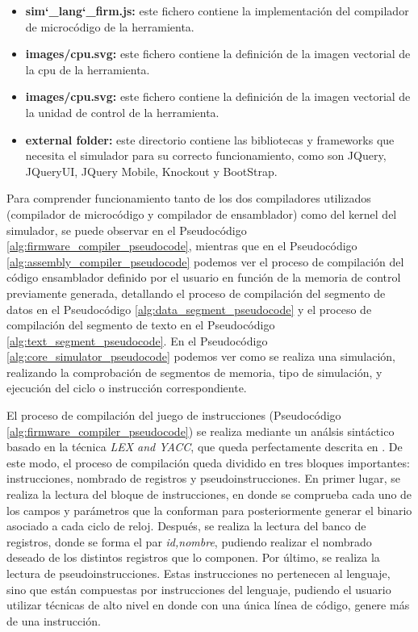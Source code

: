 \begin{itemize}
\item \textbf{sim\char`_lang\char`_firm.js: } este fichero contiene la implementación del compilador de microcódigo de la herramienta.

\item \textbf{images/cpu.svg: } este fichero contiene la definición de la imagen vectorial de la cpu de la herramienta.

\item \textbf{images/cpu.svg: } este fichero contiene la definición de la imagen vectorial de la unidad de control de la herramienta.

\item \textbf{external folder: } este directorio contiene las bibliotecas y frameworks que necesita el simulador para su correcto funcionamiento, como son JQuery, JQueryUI, JQuery Mobile, Knockout y BootStrap.

\end{itemize}

Para comprender funcionamiento tanto de los dos compiladores utilizados (compilador de microcódigo y compilador de ensamblador) como del kernel del simulador, se puede observar en el Pseudocódigo \ref{alg:firmware_compiler_pseudocode}, mientras que en el Pseudocódigo \ref{alg:assembly_compiler_pseudocode} podemos ver el proceso de compilación del código ensamblador definido por el usuario en función de la memoria de control previamente generada, detallando el proceso de compilación del segmento de datos en el Pseudocódigo \ref{alg:data_segment_pseudocode} y el proceso de compilación del segmento de texto en el Pseudocódigo \ref{alg:text_segment_pseudocode}. En el Pseudocódigo \ref{alg:core_simulator_pseudocode} podemos ver como se realiza una simulación, realizando la comprobación de segmentos de memoria, tipo de simulación, y ejecución del ciclo o instrucción correspondiente.

El proceso de compilación del juego de instrucciones (Pseudocódigo \ref{alg:firmware_compiler_pseudocode}) se realiza mediante un análsis sintáctico basado en la técnica \textit{LEX and YACC}, que queda perfectamente descrita en \cite{bennett1996introduction}. De este modo, el proceso de compilación queda dividido en tres bloques importantes: instrucciones, nombrado de registros y pseudoinstrucciones. En primer lugar, se realiza la lectura del bloque de instrucciones, en donde se comprueba cada uno de los campos y parámetros que la conforman para posteriormente generar el binario asociado a cada ciclo de reloj. Después, se realiza la lectura del banco de registros, donde se forma el par \textit{id,nombre}, pudiendo realizar el nombrado deseado de los distintos registros que lo componen. Por último, se realiza la lectura de pseudoinstrucciones. Estas instrucciones no pertenecen al lenguaje, sino que están compuestas por instrucciones del lenguaje, pudiendo el usuario utilizar técnicas de alto nivel en donde con una única línea de código, genere más de una instrucción.

